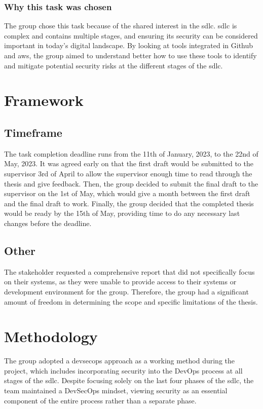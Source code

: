 \subsubsection{Why this task was chosen}
The group chose this task because of the shared interest in the \acrlong{sdlc}. \acrshort{sdlc} is complex and contains multiple stages, and ensuring its security can be considered important in today's digital landscape. By looking at tools integrated in Github and \acrshort{aws}, the group aimed to understand better how to use these tools to identify and mitigate potential security risks at the different stages of the \acrshort{sdlc}.

\newpage
\section{Framework}

\subsection{Timeframe}
The task completion deadline runs from the 11th of January, 2023, to the 22nd of May, 2023. It was agreed early on that the first draft would be submitted to the supervisor 3rd of April to allow the supervisor enough time to read through the thesis and give feedback. Then, the group decided to submit the final draft to the supervisor on the 1st of May, which would give a month between the first draft and the final draft to work. Finally, the group decided that the completed thesis would be ready by the 15th of May, providing time to do any necessary last changes before the deadline. 


\subsection{Other}
The stakeholder requested a comprehensive report that did not specifically focus on their systems, as they were unable to provide access to their systems or development environment for the group. Therefore, the group had a significant amount of freedom in determining the scope and specific limitations of the thesis. 

\section{Methodology}
The group adopted a \acrshort{devsecops} approach as a working method during the project, which includes incorporating security into the DevOps process at all stages of the \acrshort{sdlc}. Despite focusing solely on the last four phases of the \acrshort{sdlc}, the team maintained a DevSecOps mindset, viewing security as an essential component of the entire process rather than a separate phase. 


